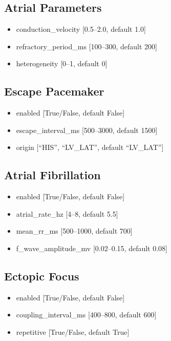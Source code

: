 \documentclass[12pt]{book}
\begin{document}
\subsection{Atrial Parameters}
\begin{itemize}
  \item conduction\_velocity [0.5--2.0, default 1.0]
  \item refractory\_period\_ms [100--300, default 200]
  \item heterogeneity [0--1, default 0]
\end{itemize}

\subsection{Escape Pacemaker}
\begin{itemize}
  \item enabled [True/False, default False]
  \item escape\_interval\_ms [500--3000, default 1500]
  \item origin [``HIS'', ``LV\_LAT'', default ``LV\_LAT'']
\end{itemize}

\subsection{Atrial Fibrillation}
\begin{itemize}
  \item enabled [True/False, default False]
  \item atrial\_rate\_hz [4--8, default 5.5]
  \item mean\_rr\_ms [500--1000, default 700]
  \item f\_wave\_amplitude\_mv [0.02--0.15, default 0.08]
\end{itemize}

\subsection{Ectopic Focus}
\begin{itemize}
  \item enabled [True/False, default False]
  \item coupling\_interval\_ms [400--800, default 600]
  \item repetitive [True/False, default True]
\end{itemize}

\end{document}
